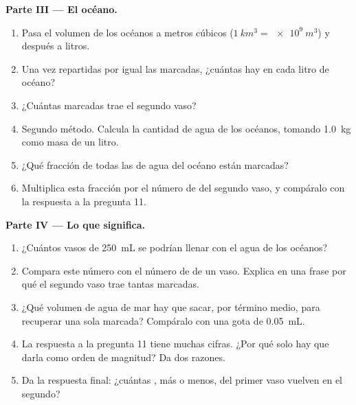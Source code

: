\begin{problem}
\medskip
\noindent\textbf{Parte III --- El océano.}
\begin{enumerate}[resume]
  \item Pasa el volumen de los océanos a metros cúbicos
        ($\qty{1}{km^3} = \qty{e9}{m^3}$) y después a litros.
  \item Una vez repartidas por igual las  marcadas, ¿cuántas
        hay en cada litro de océano?
  \item ¿Cuántas  marcadas trae el segundo vaso?
  \item Segundo método. Calcula la cantidad de agua de los océanos,
        tomando \qty{1.0}{kg} como masa de un litro.
  \item ¿Qué fracción de todas las  de agua del océano están
        marcadas?
  \item Multiplica esta fracción por el número de  del segundo
        vaso, y compáralo con la respuesta a la pregunta 11.
\end{enumerate}

\medskip
\noindent\textbf{Parte IV --- Lo que significa.}
\begin{enumerate}[resume]
  \item ¿Cuántos vasos de \qty{250}{mL} se podrían llenar con el agua de
        los océanos?
  \item Compara este número con el número de  de un vaso.
        Explica en una frase por qué el segundo vaso trae tantas
         marcadas.
  \item ¿Qué volumen de agua de mar hay que sacar, por término medio,
        para recuperar una sola  marcada? Compáralo con una gota
        de \qty{0.05}{mL}.
  \item La respuesta a la pregunta 11 tiene muchas cifras. ¿Por qué solo
        hay que darla como orden de magnitud? Da dos razones.
  \item Da la respuesta final: ¿cuántas , más o menos, del
        primer vaso vuelven en el segundo?
\end{enumerate}
\end{problem}

